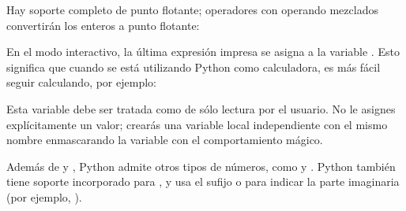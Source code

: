 \documentclass[a5paper,10pt,spanish]{sphinxmanual}
\begin{document}
\sphinxAtStartPar
Hay soporte completo de punto flotante; operadores con operando mezclados convertirán los enteros a punto flotante:

\begin{sphinxVerbatim}[commandchars=\\\{\}]
    
\end{sphinxVerbatim}

\sphinxAtStartPar
En el modo interactivo, la última expresión impresa se asigna a la variable \sphinxcode{\sphinxupquote{\_}}.  Esto significa que cuando se está utilizando Python como calculadora, es más fácil seguir calculando, por ejemplo:

\begin{sphinxVerbatim}[commandchars=\\\{\}]
    
  
  
  
 
\end{sphinxVerbatim}

\sphinxAtStartPar
Esta variable debe ser tratada como de sólo lectura por el usuario. No le asignes explícitamente un valor; crearás una variable local independiente con el mismo nombre enmascarando la variable con el comportamiento mágico.

\sphinxAtStartPar
Además de  y , Python admite otros tipos de números, como  y . Python también tiene soporte incorporado para , y usa el sufijo  o  para indicar la parte imaginaria (por ejemplo, ).
\end{document}
